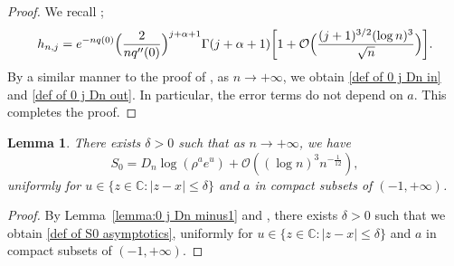 \documentclass[reqno]{amsart}
\newcommand{\1}{\mathds{1}}
\newcommand{\C}{\mathds{C}}
\numberwithin{equation}{section}
\newtheorem{lemma}[theorem]{Lemma}
\theoremstyle{definition}
\begin{document}
\begin{proof}
We recall \cite[Lemma 4.1]{ACC2023c}; 
\begin{equation}
h_{n,j}
=e^{-nq(0)}\Bigl(\frac{2}{nq''(0)}\Bigr)^{j+\alpha+1}
\Gamma(j+\alpha+1)
\bigg[1+\mathcal{O}\Bigl(\frac{(j+1)^{3/2}(\log n)^3}{\sqrt{n}}\Bigr)\bigg]. 
\end{equation}
By a similar manner to the proof of \cite[Lemma 4.1]{ACC2023c}, as $n\to+\infty$, we obtain \eqref{def of 0 j Dn in} and \eqref{def of 0 j Dn out}. 
In particular, the error terms do not depend on $a$. 
This completes the proof. 
\end{proof}

\begin{lemma}\label{lemma:S0}
There exists $\delta>0$ such that as $n\to+\infty$, we have
\begin{equation}
\label{def of S0 asymptotics}
   S_0=D_n\log(\rho^a e^{u})+\mathcal{O}((\log n)^3n^{-\frac{1}{12}}),  
\end{equation}
uniformly for $u\in\{z\in\C:|z-x|\leq \delta\}$ and $a$ in compact subsets of $(-1,+\infty)$. 
\end{lemma}
\begin{proof}
By Lemma~\ref{lemma:0 j Dn minus1} and \cite[Lemma 4.1]{ACC2023c}, 
there exists $\delta>0$ such that we obtain \eqref{def of S0 asymptotics}, uniformly for $u\in\{z\in\C:|z-x|\leq \delta\}$ and $a$ in compact subsets of $(-1,+\infty)$. 
\end{proof}
\end{document}
